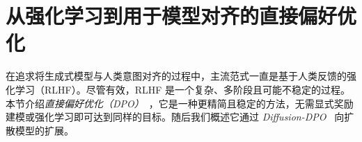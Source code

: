 \newpage
\section{从强化学习到用于模型对齐的直接偏好优化}\label{sec:rlhf-dpo}




在追求将生成式模型与人类意图对齐的过程中，主流范式一直是基于人类反馈的强化学习（RLHF）。尽管有效，RLHF 是一个复杂、多阶段且可能不稳定的过程。本节介绍\emph{直接偏好优化（DPO）}~\citep{rafailov2023direct}，它是一种更精简且稳定的方法，无需显式奖励建模或强化学习即可达到同样的目标。随后我们概述它通过 \emph{Diffusion-DPO}~\citep{wallace2024diffusion} 向扩散模型的扩展。

